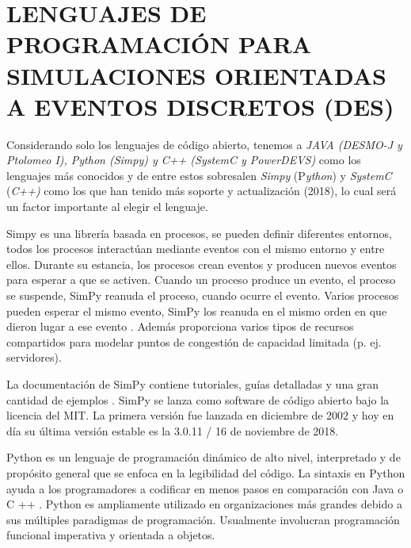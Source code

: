 
\section{LENGUAJES DE PROGRAMACIÓN PARA SIMULACIONES ORIENTADAS A EVENTOS DISCRETOS (DES)}

Considerando solo los lenguajes de código abierto, tenemos a \textit{JAVA (DESMO-J y Ptolomeo I), Python (Simpy) y C++ (SystemC y PowerDEVS)} como los lenguajes más conocidos y de entre estos sobresalen \textit{Simpy }(P\textit{ython}) y \textit{SystemC }(\textit{C++) }como los que han tenido más soporte y actualización (2018), lo cual será un factor importante al elegir el lenguaje.\newline

Simpy es una librería basada en procesos, se pueden definir diferentes entornos, todos los procesos interactúan mediante eventos con el mismo entorno y entre ellos. Durante su estancia, los procesos crean eventos y producen nuevos eventos para esperar a que se activen. Cuando un proceso produce un evento, el proceso se suspende, SimPy reanuda el proceso, cuando ocurre el evento. Varios procesos pueden esperar el mismo evento, SimPy los reanuda en el mismo orden en que dieron lugar a ese evento \parencite{Simpy}. Además proporciona varios tipos de recursos compartidos para modelar puntos de congestión de capacidad limitada (p. ej. servidores).\newline

La documentación de SimPy contiene tutoriales, guías detalladas y una gran cantidad de ejemplos \parencite{Simpy}. SimPy se lanza como software de código abierto bajo la licencia del MIT. La primera versión fue lanzada en diciembre de 2002 y hoy en día su última versión estable es la 3.0.11 / 16 de noviembre de 2018.\newline

Python es un lenguaje de programación dinámico de alto nivel, interpretado y de propósito general que se enfoca en la legibilidad del código. La sintaxis en Python ayuda a los programadores a codificar en menos pasos en comparación con Java o C ++ \parencite{PythonVentajas}. Python es ampliamente utilizado en organizaciones más grandes debido a sus múltiples paradigmas de programación. Usualmente involucran programación funcional imperativa y orientada a objetos. \newline

